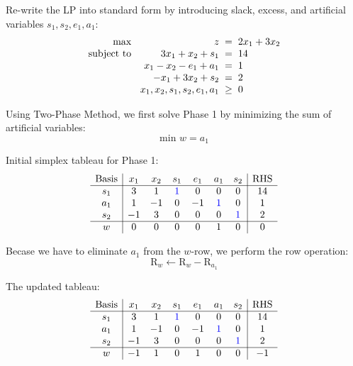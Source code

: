 \documentclass[a4paper, 10pt]{article}
\begin{document}
\begin{solution}
Re-write the LP into standard form by introducing slack, excess, and artificial variables \(s_1, s_2, e_1, a_1\):
\[
\begin{array}{@{\hspace{2mm}} r @{\hspace{2mm}} r @{\hspace{2mm}} c @{\hspace{2mm}} l}
    \text{max } & z & = & 2x_1 + 3x_2 \\
    \text{subject to } & 3x_1 + x_2 + s_1 & = & 14 \\
    & x_1 - x_2 - e_1 + a_1 & = & 1 \\
    & -x_1 + 3x_2 + s_2 & = & 2 \\
    & x_1, x_2, s_1, s_2, e_1, a_1 & \geq & 0
\end{array}
\]

Using Two-Phase Method, we first solve Phase 1 by minimizing the sum of artificial variables:
\[ \text{min } w = a_1 \]

Initial simplex tableau for Phase 1:
\[
\begin{array}{c|cccccc|c}
    \text{Basis} & x_1 & x_2 & s_1 & e_1 & a_1 & s_2 & \text{RHS} \\
    \hline
    s_1 & 3 & 1 & \textcolor[HTML]{0000FF}{1} & 0 & 0 & 0 & 14 \\
    a_1 & 1 & -1 & 0 & -1 & \textcolor[HTML]{0000FF}{1} & 0 & 1 \\
    s_2 & -1 & 3 & 0 & 0 & 0 & \textcolor[HTML]{0000FF}{1} & 2 \\
    \hline
    w & 0 & 0 & 0 & 0 & 1 & 0 & 0 \\
\end{array}
\]

Becase we have to eliminate \( a_1 \) from the \( w \)-row, we perform the row operation:
\[ \text{R}_w \leftarrow \text{R}_w - \text{R}_{a_1} \]


The updated tableau:
\[
\begin{array}{c|cccccc|c}
    \text{Basis} & x_1 & x_2 & s_1 & e_1 & a_1 & s_2 & \text{RHS} \\
    \hline
    s_1 & 3 & 1 & \textcolor[HTML]{0000FF}{1} & 0 & 0 & 0 & 14 \\
    a_1 & 1 & -1 & 0 & -1 & \textcolor[HTML]{0000FF}{1} & 0 & 1 \\
    s_2 & -1 & 3 & 0 & 0 & 0 & \textcolor[HTML]{0000FF}{1} & 2 \\
    \hline
    w & -1 & 1 & 0 & 1 & 0 & 0 & -1 \\
\end{array}
\]


\end{solution}
\end{document}

